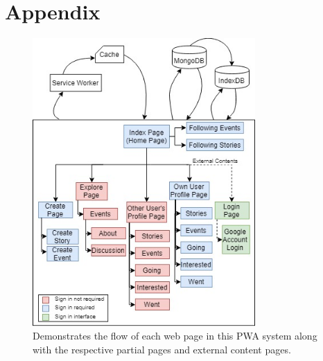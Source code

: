 \documentclass[11pt, a4paper]{article}
\begin{document}
\printbibliography

\appendix
\section{Appendix}
\begin{figure}[H]
  \begin{center}
    \includegraphics[width=8.5cm]{site_map.jpg}
    \caption{Demonstrates the flow of each web page in this PWA system along with the respective
    partial pages and external content pages.}
    \label{figure:site_map}
  \end{center}
\end{figure}
\end{document}
